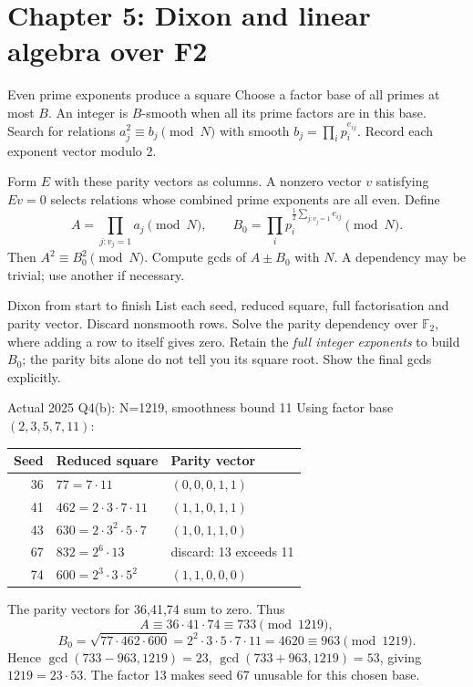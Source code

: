 \documentclass[11pt,a4paper]{article}
\newcommand{\F}{\mathbb F}\newcommand{\Z}{\mathbb Z}
\begin{document}
\section{Chapter 5: Dixon and linear algebra over F2}
\begin{concept}{Even prime exponents produce a square}
Choose a factor base of all primes at most \(B\). An integer is \(B\)-smooth when all its prime factors are in this base. Search for relations \(a_j^2\equiv b_j\pmod N\) with smooth \(b_j=\prod_i p_i^{e_{ij}}\). Record each exponent vector modulo 2.

Form \(E\) with these parity vectors as columns. A nonzero vector \(v\) satisfying \(Ev=0\) selects relations whose combined prime exponents are all even. Define
\[A=\prod_{j:v_j=1}a_j\pmod N,\qquad B_0=\prod_i p_i^{\frac12\sum_{j:v_j=1}e_{ij}}\pmod N.\]
Then \(A^2\equiv B_0^2\pmod N\). Compute gcds of \(A\pm B_0\) with \(N\). A dependency may be trivial; use another if necessary.
\end{concept}
\begin{method}{Dixon from start to finish}
List each seed, reduced square, full factorisation and parity vector. Discard nonsmooth rows. Solve the parity dependency over \(\F_2\), where adding a row to itself gives zero. Retain the \emph{full integer exponents} to build \(B_0\); the parity bits alone do not tell you its square root. Show the final gcds explicitly.
\end{method}
\begin{example}{Actual 2025 Q4(b): N=1219, smoothness bound 11}
Using factor base \((2,3,5,7,11)\):
\begin{center}\begin{tabular}{rll}\toprule Seed&Reduced square&Parity vector\\\midrule
36&\(77=7\cdot11\)&\((0,0,0,1,1)\)\\
41&\(462=2\cdot3\cdot7\cdot11\)&\((1,1,0,1,1)\)\\
43&\(630=2\cdot3^2\cdot5\cdot7\)&\((1,0,1,1,0)\)\\
67&\(832=2^6\cdot13\)&discard: 13 exceeds 11\\
74&\(600=2^3\cdot3\cdot5^2\)&\((1,1,0,0,0)\)\\\bottomrule\end{tabular}\end{center}
The parity vectors for 36,41,74 sum to zero. Thus
\[A\equiv36\cdot41\cdot74\equiv733\pmod{1219},\]
\[B_0=\sqrt{77\cdot462\cdot600}=2^2\cdot3\cdot5\cdot7\cdot11=4620\equiv963\pmod{1219}.\]
Hence \(\gcd(733-963,1219)=23\), \(\gcd(733+963,1219)=53\), giving \(1219=23\cdot53\). The factor 13 makes seed 67 unusable for this chosen base.
\end{example}
\end{document}
